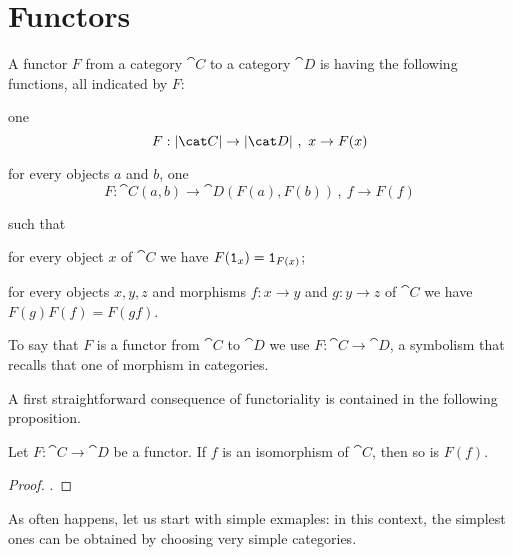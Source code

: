 
\section{Functors}

\begin{definition}[Functors]\label{definition:Functors}
A functor \(F\) from a category \(\cat C\) to a category \(\cat D\) is having the following functions, all indicated by \(F\):
\begin{tcbitem}
\item one 
\[F : \obj{\cat C} \to \obj{\cat D}\,,\ x \to F(x)\]
\item for every objects \(a\) and  \(b\), one 
\[F : \cat C(a, b) \to \cat D(F(a), F(b))\,,\ f \to F(f)\]
\end{tcbitem}
such that
\begin{tcbenum}
\item for every object \(x\) of \(\cat C\) we have \(F(\mathtt 1_x) = \mathtt 1_{F(x)}\);
\item for every objects \(x, y, z\) and morphisms \(f : x \to y\) and \(g : y \to z\) of \(\cat C\) we have \(F(g) F(f) = F(gf)\).
\end{tcbenum}
To say that \(F\) is a functor from \(\cat C\) to \(\cat D\) we use \(F : \cat C \to \cat D\), a symbolism that recalls that one of morphism in categories.
\end{definition}

A first straightforward consequence of functoriality is contained in the following proposition.

\begin{proposition}
Let \(F : \cat C \to \cat D\) be a functor. If \(f\) is an isomorphism of \(\cat C\), then so is \(F(f)\).
\end{proposition}

\begin{proof}
.
\end{proof}

As often happens, let us start with simple exmaples: in this context, the simplest ones can be obtained by choosing very simple categories.

